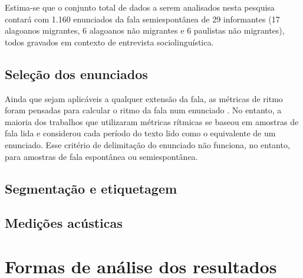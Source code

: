 \documentclass[
	a4paper,	%
	12pt,		%
	]{article}	%
\begin{document}
	Estima-se que o conjunto total de dados a serem analisados nesta pesquisa contará com 1.160
	enunciados da fala semiespontânea de 29 informantes (17 alagoanos migrantes, 6 alagoanos não
	migrantes e 6 paulistas não migrantes), todos gravados em contexto de entrevista
	sociolinguística.
	
	\subsection{Seleção dos enunciados} 
	\label{selecao}

	Ainda que sejam aplicáveis a qualquer extensão da fala, as métricas de ritmo foram pensadas para
	calcular o ritmo da fala num enunciado \citep{Fuchs2016}. No entanto, a maioria dos trabalhos
	que utilizaram métricas rítmicas se baseou em amostras de fala lida e considerou cada período do
	texto lido como o equivalente de um enunciado. Esse critério de delimitação do enunciado não
	funciona, no entanto, para amostras de fala espontânea ou semiespontânea.

	\subsection{Segmentação e etiquetagem} 
	\label{segm}

	\subsection{Medições acústicas} 
	\label{medicoes}
	
\section{Formas de análise dos resultados} 
\label{analise}

{ %
	\printbibliography
}
\end{document}
